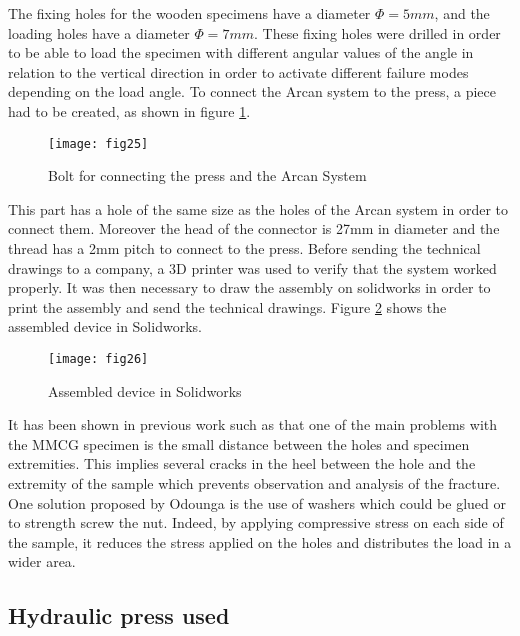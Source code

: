 The fixing holes for the wooden specimens have a diameter $\Phi= 5 mm$, and the loading holes have a diameter $\Phi = 7 mm$. These fixing holes were drilled in order to be able to load the specimen with different angular values of the angle in relation to the vertical direction in order to activate different failure modes depending on the load angle. To connect the Arcan system to the press, a piece had to be created, as shown in figure \ref{fig:fig25}.

\graphicspath{{Images/}}
\begin{figure}[htp]
	\centering
	\texttt{[image: fig25]}
	\caption{Bolt for connecting the press and the Arcan System}
	\label{fig:fig25}
\end{figure}

This part has a hole of the same size as the holes of the Arcan system in order to connect them. Moreover the head of the connector is 27mm in diameter and the thread has a 2mm pitch to connect to the press. Before sending the technical drawings to a company, a 3D printer was used to verify that the system worked properly. It was then necessary to draw the assembly on solidworks in order to print the assembly and send the technical drawings. Figure \ref{fig:fig26} shows the assembled device in Solidworks.

\graphicspath{{Images/}}
\begin{figure}[htp]
	\centering
	\texttt{[image: fig26]}
	\caption{Assembled device in Solidworks}
	\label{fig:fig26}
\end{figure}

It has been shown in previous work such as \cite{Reference9} that one of the main problems with the MMCG specimen is the small distance between the holes and specimen extremities. This implies several cracks in the heel between the hole and the extremity of the sample which prevents observation and analysis of the fracture. One solution proposed by Odounga is the use of washers which could be glued or to strength screw the nut. Indeed, by applying compressive stress on each side of the sample, it reduces the stress applied on the holes and distributes the load in a wider area.

\subsection{Hydraulic press used}

